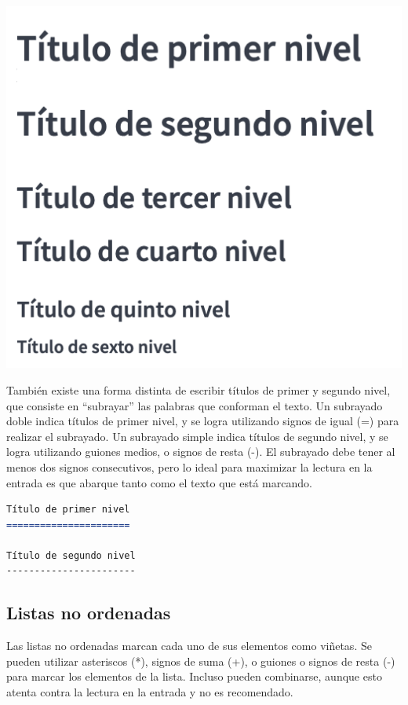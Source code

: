 \includegraphics[]{apendices/markdown/imagenes/md_titulos.png}

También existe una forma distinta de escribir títulos de primer y segundo
nivel, que consiste en ``subrayar'' las palabras que conforman el texto.
Un subrayado doble indica títulos de primer nivel, y se logra utilizando
signos de igual (=) para realizar el subrayado. Un subrayado simple indica
títulos de segundo nivel, y se logra utilizando guiones medios, o signos de
resta (-). El subrayado debe tener al menos dos signos consecutivos, pero
lo ideal para maximizar la lectura en la entrada es que abarque tanto como
el texto que está marcando.

\begin{lstlisting}[language=Markdown,otherkeywords={=,-},morekeywords={[2]{=,-}}]
Título de primer nivel
======================

Título de segundo nivel
-----------------------
\end{lstlisting}

\subsection*{Listas no ordenadas}

Las listas no ordenadas marcan cada uno de sus elementos como viñetas.
Se pueden utilizar asteriscos (*), signos de suma (+), o guiones o signos
de resta (-) para marcar los elementos de la lista. Incluso pueden combinarse,
aunque esto atenta contra la lectura en la entrada y no es recomendado.

